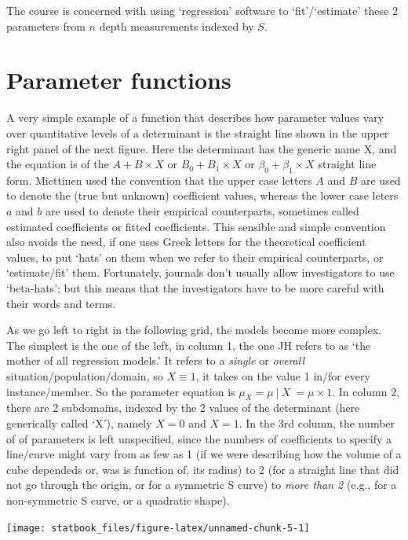 \documentclass[]{book}
\begin{document}
The course is concerned with using `regression' software to `fit'/`estimate' these 2 parameters from \(n\) depth measurements indexed by \(S\).

\hypertarget{parameter-functions}{%
\section{Parameter functions}\label{parameter-functions}}

A very simple example of a function that describes how parameter values vary over quantitative levels of a determinant is the straight line shown in the upper right panel of the next figure. Here the determinant has the generic name X, and the equation is of the \(A + B \times X\) or \(B_0 + B_1 \times X\) or \(\beta_0 + \beta_1 \times X\) straight line form. Miettinen used the convention that the upper case letters \(A\) and \(B\) are used to denote the (true but unknown) coefficient values, whereas the lower case leters \(a\) and \(b\) are used to denote their empirical counterparts, sometimes called estimated coefficients or fitted coefficients. This sensible and simple convention also avoids the need, if one uses Greek letters for the theoretical coefficient values, to put `hats' on them when we refer to their empirical counterparts, or `estimate/fit' them. Fortunately, journals don't usually allow investigators to use `beta-hats'; but this means that the investigators have to be more careful with their words and terms.

As we go left to right in the following grid, the models become more complex. The simplest is the one of the left, in column 1, the one JH refers to as `the mother of all regression models.' It refers to a \emph{single} or \emph{overall} situation/population/domain, so \(X \equiv 1\), it takes on the value 1 in/for every instance/member. So the parameter equation is \(\mu_X = \mu \ | \ X \ = \mu \times 1.\) In column 2, there are 2 subdomains, indexed by the 2 values of the determinant (here generically called `X'), namely \(X = 0\) and \(X = 1\). In the 3rd column, the number of of parameters is left unspecified, since the numbers of coefficients to specify a line/curve might vary from as few as 1 (if we were describing how the volume of a cube dependeds or, was is function of, its radius) to 2 (for a straight line that did not go through the origin, or for a symmetric S curve) to \emph{more than 2} (e.g., for a non-symmetric S curve, or a quadratic shape).

\begin{center}\texttt{[image: statbook\_files/figure-latex/unnamed-chunk-5-1]} \end{center}
\end{document}
